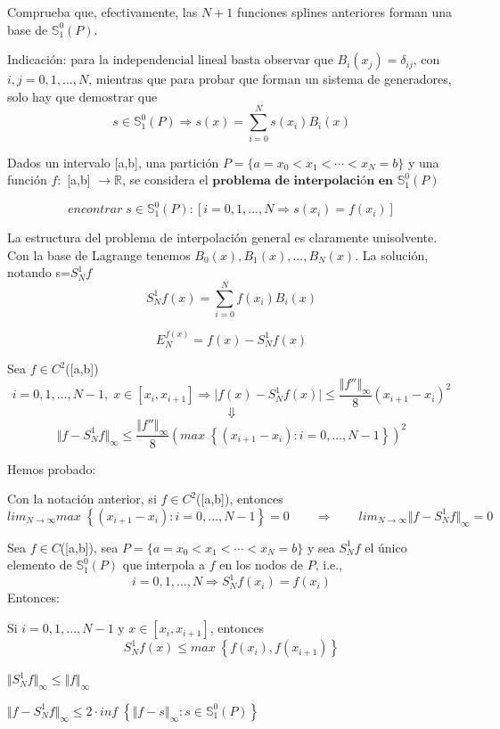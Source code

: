 \begin{ejer}
Comprueba que, efectivamente, las $N+1$ funciones splines anteriores forman una base de $\mathbb{S}_1^0 (P)$.

Indicación: para la independencial lineal basta observar que $B_i(x_j) = \delta _{ij}$, con $i,j=0,1,...,N$, mientras que para probar que forman un sistema de generadores, solo hay que demostrar que
\[ s \in \mathbb{S}_1^0 (P) \Rightarrow s(x) = \sum_{i=0}^N s(x_i)B_i(x) \]
\end{ejer}

Dados un intervalo [a,b], una partición $P = \lbrace a=x_0 < x_1 < \cdots < x_N = b\rbrace$ y una función $f:$ [a,b] $\longrightarrow \mathbb{R}$, se considera el $\textbf{problema de interpolación en}$ $\mathbb{S}_1^0(P)$

\[encontrar \; s \in \mathbb{S}_1^0(P) : \left[ i=0,1,...,N \Rightarrow s(x_i) = f(x_i) \right] \]

La estructura del problema de interpolación general es claramente unisolvente. Con la base de Lagrange tenemos {$B_0(x), B_1(x),...,B_N(x)$}. La solución, notando s=$S_N^1f$
\[ S_N^1f(x) = \sum_{i=0}^N f(x_i)B_i(x) \]

\begin{ndef}
\[ E_N^{f(x)} = f(x) - S_N^1f(x) \]
\end{ndef}

Sea $f \in C^2$([a,b])
\[ i=0,1,...,N-1, \; x \in \left[ x_i,x_{i+1} \right] \Rightarrow \vert f(x) - S_N^1f(x) \vert \leq \frac{\Vert f'' \Vert _\infty}{8}(x_{i+1}-x_i)^2 \]
\[ \Downarrow \]
\[ \Vert f-S_N^1f \Vert _\infty \leq \frac{\Vert f'' \Vert _\infty}{8} \left( max \; \left\lbrace (x_{i+1}-x_i):i=0,...,N-1 \right\rbrace \right) ^2 \]

Hemos probado:

\begin{nprop}
Con la notación anterior, si $f \in C^2$([a,b]), entonces
\[ lim_{N\rightarrow \infty} max \; \left\lbrace (x_{i+1}-x_i):i=0,...,N-1 \right\rbrace = 0 \qquad \Rightarrow \qquad lim_{N \rightarrow \infty} \Vert f - S_N^1f \Vert _\infty = 0 \]
\end{nprop}

\begin{nprop}
Sea $f \in C$([a,b]), sea $P = \lbrace a=x_0 < x_1 < \cdots < x_N = b\rbrace$ y sea $S_N^1f$ el único elemento de $\mathbb{S}_1^0(P)$ que interpola a $f$ en los nodos de $P$, i.e.,
\[ i=0,1,...,N \Rightarrow S_N^1f(x_i)=f(x_i) \]
Entonces:
	\begin{nlist}
	\item Si $i=0,1,...,N-1$ y $x \in \left[ x_i,x_{i+1} \right]$, entonces
	\[ S_N^1f(x) \leq max \; \left\lbrace f(x_i),f(x_{i+1}) \right\rbrace \]
	\item $\Vert S_N^1f \Vert _\infty \leq \Vert f \Vert _\infty $
	\item $\Vert f - S_N^1f \Vert _\infty \leq 2 \cdot inf \; \left\lbrace \Vert f-s \Vert _\infty : s \in \mathbb{S}_1^0(P) \right\rbrace$
	\end{nlist}
\end{nprop}

